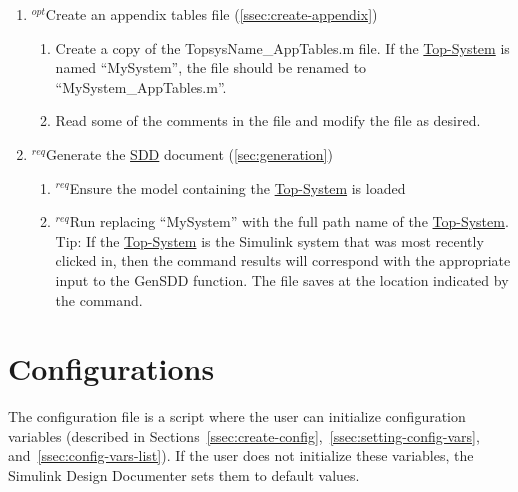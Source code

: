 \documentclass{mcscert}
\newcommand{\simulink}{Simulink}
\newcommand{\sddtool}{Simulink Design Documenter}
\newcommand{\topsystemnolink}{Top-System} %
\newcommand{\topsystem}{\hyperref[def:topsystem]{\topsystemnolink{}}}
\begin{document}
\begin{enumerate}


	\item $^{opt}$Create an appendix tables file (\hyperref[ssec:create-appendix]{\ref*{ssec:create-appendix}})
	\begin{enumerate}
		\item Create a copy of the TopsysName\_AppTables.m file. 
		If the \topsystem{} is named ``MySystem'', the file should be renamed to ``MySystem\_AppTables.m''.
		\item Read some of the comments in the file and modify the file as desired.
	\end{enumerate}
	\item $^{req}$Generate the \hyperref[acr:sdd]{SDD} document (\hyperref[sec:generation]{\ref*{sec:generation}})
	\begin{enumerate}
		\item $^{req}$Ensure the model containing the \topsystem{} is loaded
		\item $^{req}$Run  replacing ``MySystem'' with the full path name of the \topsystem{}. 
		Tip: If the \topsystem{} is the \simulink{} system that was most recently clicked in, then the  command results will correspond with the appropriate input to the GenSDD function. 
		The file saves at the location indicated by the  command.
	\end{enumerate}
\end{enumerate}
    
\section{Configurations} 
\label{sec:configurations}
The configuration file is a \matlab{} script where the user can initialize configuration variables (described in Sections~\ref{ssec:create-config},~\ref{ssec:setting-config-vars}, and~\ref{ssec:config-vars-list}). 
If the user does not initialize these variables, the \sddtool{} sets them to default values.
  
\end{document}
